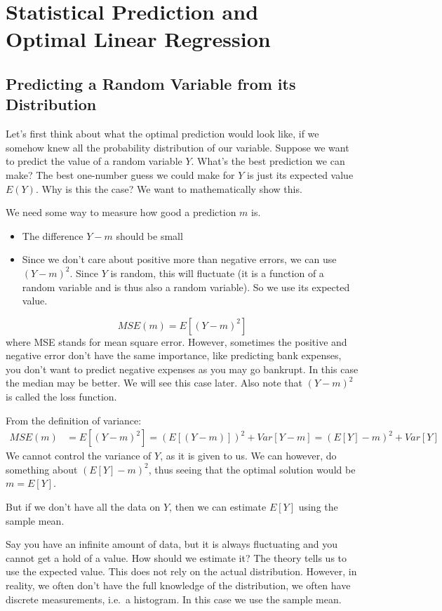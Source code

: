 \documentclass[12 pt]{article}
\begin{document}
\section{Statistical Prediction and\\ Optimal Linear Regression}
\subsection{Predicting a Random Variable from its Distribution}
Let's first think about what the optimal prediction would look like,
if we somehow knew all the probability distribution of our
variable. Suppose we want to predict the value of a random variable
$Y$. What's the best prediction we can make? The best one-number guess
we could make for $Y$ is just its expected value $E(Y)$. Why is this
the case? We want to mathematically show this.

We need some way to measure how good a prediction $m$ is.
\begin{itemize}
\item The difference $Y-m$ should be small
\item Since we don't care about positive more than negative errors, we
  can use $(Y-m)^2$. Since $Y$ is random, this will fluctuate (it is a
  function of a random variable and is thus also a random variable). So we
  use its expected value.
\end{itemize}
  $$MSE(m) = E[(Y-m)^2]$$
  where MSE stands for mean square error. However, sometimes the
  positive and negative error don't have the same importance, like
  predicting bank expenses, you don't want to predict negative
  expenses as you may go bankrupt. In this case the median may be
  better. We will see this case later. Also note that $(Y-m)^2$ is
  called the loss function.

  From the definition of variance:
  \begin{align*}
    MSE(m) & = E[(Y-m)^2] = (E[(Y-m)])^2 + Var[Y-m] = (E[Y]-m)^2 + Var[Y]
  \end{align*}
  We cannot control the variance of $Y$, as it is given to us. We can
  however, do something about $(E[Y] - m)^2$, thus seeing that the
  optimal solution would be $m = E[Y]$.

  But if we don't have all the data on $Y$, then we can estimate
  $E[Y]$ using the sample mean.

Say you have an infinite amount of data, but it is always fluctuating
and you cannot get a hold of a value. How should we estimate it? The
theory tells us to use the expected value. This does not rely on the
actual distribution. However, in reality, we often don't have the full
knowledge of the distribution, we often have discrete measurements,
i.e.\ a histogram. In this case we use the sample mean.
\end{document}
